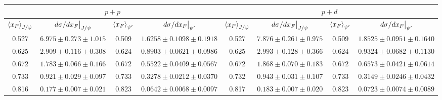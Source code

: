 \begin{tabular}{cccc|cccc}
\hline
\multicolumn{4}{c|}{$p+p$}                                                                                                                                                                                     & \multicolumn{4}{c}{$p+d$}                                                                                                                                                                                     \\ \hline
\multicolumn{1}{c}{$\expval{x_F}_{J/\psi}$} & \multicolumn{1}{c}{$\eval{d\sigma/dx_F}_{J/\psi}$} & \multicolumn{1}{c}{$\expval{x_F}_{\psi^\prime}$} & \multicolumn{1}{c|}{$\eval{d\sigma/dx_F}_{\psi^\prime}$} & \multicolumn{1}{c}{$\expval{x_F}_{J/\psi}$} & \multicolumn{1}{c}{$\eval{d\sigma/dx_F}_{J/\psi}$} & \multicolumn{1}{c}{$\expval{x_F}_{\psi^\prime}$} & \multicolumn{1}{c}{$\eval{d\sigma/dx_F}_{\psi^\prime}$} \\ \hline
0.527                                       & $6.975\pm0.273\pm1.015$                            & 0.509                                            & $1.6258\pm0.1098\pm0.1918$                               & 0.527                                       & $7.876\pm0.261\pm0.975$                            & 0.509                                            & $1.8525\pm0.0951\pm0.1640$                              \\
0.625                                       & $2.909\pm0.116\pm0.308$                            & 0.624                                            & $0.8903\pm0.0621\pm0.0986$                               & 0.625                                       & $2.993\pm0.128\pm0.366$                            & 0.624                                            & $0.9324\pm0.0682\pm0.1130$                              \\
0.672                                       & $1.783\pm0.066\pm0.166$                            & 0.672                                            & $0.5522\pm0.0409\pm0.0567$                               & 0.672                                       & $1.868\pm0.070\pm0.183$                            & 0.672                                            & $0.6573\pm0.0421\pm0.0614$                              \\
0.733                                       & $0.921\pm0.029\pm0.097$                            & 0.733                                            & $0.3278\pm0.0212\pm0.0370$                               & 0.732                                       & $0.943\pm0.031\pm0.107$                            & 0.733                                            & $0.3149\pm0.0246\pm0.0432$                              \\
0.816                                       & $0.177\pm0.007\pm0.021$                            & 0.823                                            & $0.0642\pm0.0068\pm0.0097$                               & 0.817                                       & $0.183\pm0.007\pm0.020$                            & 0.823                                            & $0.0723\pm0.0074\pm0.0089$                              \\ \hline
\end{tabular}
